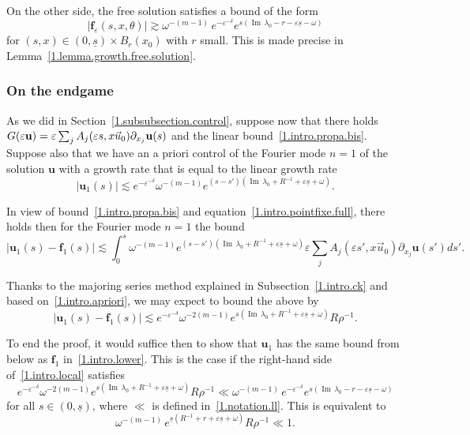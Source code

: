 \documentclass[AHL,Unicode,longabstracts,published]{cedram}
\theoremstyle{plain}
\newcommand*\e{\varepsilon}
\newcommand{\dptl}{\partial}%
\newcommand{\ubf}{{\mathbf u}}
\newcommand*\f{{\mathbf f}}
\newcommand*\und{\underline}
\DeclareMathOperator{\Imm}{Im}
\begin{document}
On the other side, the free solution satisfies a bound of the form
\begin{equation}\label{1.intro.lower}
|\f_{\e}(s,x,\theta)| \gtrsim \omega^{-(m-1)}\,e^{-\e^{-\delta}} e^{s({\Imm}\,\lambda_0 - r - \e \und{s} - \omega)}
\end{equation}
for $(s,x)\in(0,\und{s})\times B_{r}(x_0)$ with $r$ small. This is made precise in Lemma~\ref{1.lemma.growth.free.solution}.



\subsubsection{On the endgame}\label{1.intro.endgame}
As we did in Section~\ref{1.subsubsection.control}, suppose now that there holds $G(\e\ubf) = \e \sum_j A_j(\e s, x \vec{u}_0)\linebreak\dptl_{x_j}\ubf(s)$ and the linear bound~\eqref{1.intro.propa.bis}. Suppose also that we have an a priori control of the Fourier mode $n=1$ of the solution $\ubf$ with a growth rate that is equal to the linear growth rate
\begin{equation}\label{1.intro.apriori}
|\ubf_1(s)| \lesssim e^{-\e^{-\delta}} \omega^{-(m-1)} e^{(s-s') ({\Imm}\,\lambda_0 + R^{-1} + \e \und{s} + \omega)}.
\end{equation}


In view of bound~\eqref{1.intro.propa.bis} and equation~\eqref{1.intro.pointfixe.full}, there holds then for the Fourier mode $n=1$ the bound
\[
|\ubf_1(s) - \f_1(s)| \lesssim \int_{0}^{s} \omega^{-(m-1)} e^{(s-s') ({\Imm}\,\lambda_0 + R^{-1} + \e \und{s} + \omega)} \e \sum_j A_j(\e s', x \vec{u}_0) \dptl_{x_j}\ubf(s') ds'.
\]


Thanks to the majoring series method explained in Subsection~\ref{1.intro.ck} and based on~\eqref{1.intro.apriori}, we may expect to bound the above by
\begin{equation}\label{1.intro.local}
|\ubf_1(s) - \f_1(s)| \lesssim e^{-\e^{-\delta}} \omega^{-2(m-1)} e^{s ({\Imm}\,\lambda_0 + R^{-1} + \e \und{s} + \omega)} R\rho^{-1}.
\end{equation}


To end the proof, it would suffice then to show that $\ubf_1$ has the same bound from below as $\f_1$ in~\eqref{1.intro.lower}. This is the case if the right-hand side of~\eqref{1.intro.local} satisfies
\begin{equation}\label{1.intro.intermediaire}
e^{-\e^{-\delta}} \omega^{-2(m-1)} e^{s ({\Imm}\,\lambda_0 + R^{-1} + \e \und{s} + \omega)} R\rho^{-1} \ll \omega^{-(m-1)}\,e^{-\e^{-\delta}} e^{s({\Imm}\,\lambda_0 - r - \e \und{s} - \omega)}
\end{equation}
for all $s\in(0,\und{s})$, where $\ll$ is defined in~\eqref{1.notation.ll}. This is equivalent to
\begin{equation}\label{1.intro.constraint}
\omega^{-(m-1)}\,e^{\und{s} (R^{-1} + r + \e \und{s} + \omega)} R\rho^{-1} \ll 1.
\end{equation}
\end{document}
